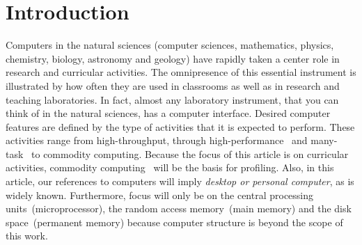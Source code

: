 \section{Introduction}
\label{introduction}
Computers in the natural sciences (computer sciences, mathematics, physics, 
chemistry, biology, astronomy and geology) have rapidly taken a center role 
in research and curricular activities. The omnipresence of this essential instrument
is illustrated by how often they are used in classrooms as well as in research 
and teaching laboratories. In fact, almost any laboratory instrument, that 
you can think of in the natural sciences, has a computer interface. Desired computer 
features are defined by the type of activities that it is expected to perform. These activities 
range from high-throughput, through high-performance~\cite{FienenMN2015} and 
many-task~\cite{Jik-SooK2013} to commodity computing. Because the focus of this 
article is on curricular activities, commodity computing~\cite{BachthalerS2007}
 will be the basis for profiling. Also, in this article, our references to computers 
will imply {\it desktop or personal computer}, as is widely known. Furthermore, focus 
will only be on the central processing units~(microprocessor), the random access 
memory~(main memory) and the disk space~(permanent memory) because computer 
structure is beyond the scope of this work.
 

